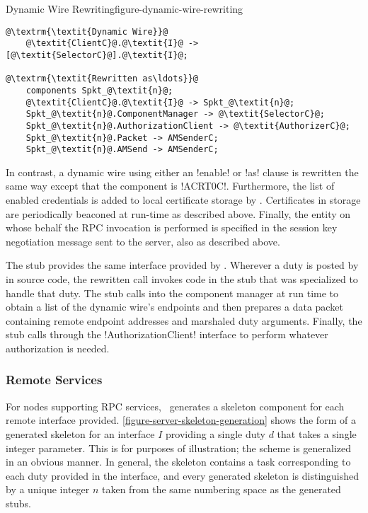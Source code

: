 \begin{fpfig}[t]{Dynamic Wire Rewriting}{figure-dynamic-wire-rewriting}
{
\singlespace
\begin{lstlisting}[escapechar=@]
@\textrm{\textit{Dynamic Wire}}@
    @\textit{ClientC}@.@\textit{I}@ -> [@\textit{SelectorC}@].@\textit{I}@;

@\textrm{\textit{Rewritten as\ldots}}@
    components Spkt_@\textit{n}@;
    @\textit{ClientC}@.@\textit{I}@ -> Spkt_@\textit{n}@;
    Spkt_@\textit{n}@.ComponentManager -> @\textit{SelectorC}@;
    Spkt_@\textit{n}@.AuthorizationClient -> @\textit{AuthorizerC}@;
    Spkt_@\textit{n}@.Packet -> AMSenderC;
    Spkt_@\textit{n}@.AMSend -> AMSenderC;
\end{lstlisting}
\primaryspacing
}
\end{fpfig}

In contrast, a dynamic wire using either an !enable! or !as! clause is rewritten the same way
except that the  component is !ACRT0C!. Furthermore, the list of
enabled credentials is added to local certificate storage by \Sprocket. Certificates in storage
are periodically beaconed at run-time as described above. Finally, the entity on whose behalf
the RPC invocation is performed is specified in the session key negotiation message sent to the
server, also as described above.

The  stub provides the same interface provided by
. Wherever a duty is posted by  in source code,
the rewritten call invokes code in the stub that was specialized to handle that duty. The stub
calls into the component manager at run time to obtain a list of the dynamic wire's endpoints
and then prepares a data packet containing remote endpoint addresses and marshaled duty
arguments. Finally, the stub calls through the !AuthorizationClient! interface to perform
whatever authorization is needed.

\subsubsection{Remote Services}

For nodes supporting RPC services, \Sprocket\ generates a skeleton component for each remote
interface provided. \autoref{figure-server-skeleton-generation} shows the form of a generated
skeleton for an interface $I$ providing a single duty $d$ that takes a single integer parameter.
This is for purposes of illustration; the scheme is generalized in an obvious manner. In
general, the skeleton contains a task corresponding to each duty provided in the interface, and
every generated skeleton is distinguished by a unique integer $n$ taken from the same numbering
space as the generated stubs.

